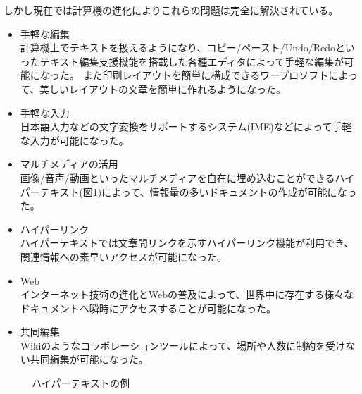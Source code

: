 しかし現在では計算機の進化によりこれらの問題は完全に解決されている。
\begin{itemize}
    \item 手軽な編集\\
    計算機上でテキストを扱えるようになり、コピー/ペースト/Undo/Redoといったテキスト編集支援機能を搭載した各種エディタによって手軽な編集が可能になった。
    また印刷レイアウトを簡単に構成できるワープロソフトによって、美しいレイアウトの文章を簡単に作れるようになった。
    \item 手軽な入力\\
    日本語入力などの文字変換をサポートするシステム(IME)などによって手軽な入力が可能になった。
    \item マルチメディアの活用\\
    画像/音声/動画といったマルチメディアを自在に埋め込むことができるハイパーテキスト(図\ref{hy})によって、情報量の多いドキュメントの作成が可能になった。
    \item ハイパーリンク\\
    ハイパーテキストでは文章間リンクを示すハイパーリンク機能が利用でき、関連情報への素早いアクセスが可能になった。
    \item Web\\
    インターネット技術の進化とWebの普及によって、世界中に存在する様々なドキュメントへ瞬時にアクセスすることが可能になった。
    \item 共同編集\\
    Wikiのようなコラボレーションツールによって、場所や人数に制約を受けない共同編集が可能になった。
\end{itemize}


\begin{figure}[H]
    \centering
    \caption{ハイパーテキストの例}
    \label{hy}
\end{figure}

